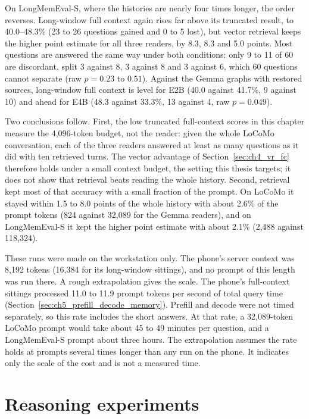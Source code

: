 On LongMemEval-S, where the histories are nearly four times longer, the order reverses. Long-window
full context again rises far above its truncated result, to 40.0--48.3\% (23 to 26 questions gained
and 0 to 5 lost), but vector retrieval keeps the higher point estimate for all three readers, by 8.3,
8.3 and 5.0 points. Most questions are answered the same way under both conditions: only 9 to 11 of
60 are discordant, split 3 against 8, 3 against 8 and 3 against 6, which 60 questions cannot
separate (raw $p=0.23$ to $0.51$). Against the Gemma graphs with restored sources, long-window full
context is level for E2B (40.0 against 41.7\%, 9 against 10) and ahead for E4B (48.3 against 33.3\%,
13 against 4, raw $p=0.049$).

Two conclusions follow. First, the low truncated full-context scores in this chapter measure the
4,096-token budget, not the reader: given the whole LoCoMo conversation, each of the three readers
answered at least as many questions as it did with ten retrieved turns. The vector advantage of
Section~\ref{sec:ch4_vr_fc} therefore holds under a small context budget, the setting this thesis
targets; it does not show that retrieval beats reading the whole history.
Second, retrieval kept most of that accuracy with a small fraction of the prompt. On LoCoMo it
stayed within 1.5 to 8.0 points of the whole history with about 2.6\% of the prompt tokens (824 against 32,089 for the
Gemma readers), and on LongMemEval-S it kept the higher point estimate with about 2.1\% (2,488
against 118,324).

These runs were made on the workstation only. The phone's server context was 8,192 tokens (16,384
for its long-window sittings), and no prompt of this length was run there. A rough extrapolation
gives the scale. The phone's full-context sittings processed 11.0 to 11.9 prompt tokens per second
of total query time (Section~\ref{sec:ch5_prefill_decode_memory}). Prefill and decode were not
timed separately, so this rate includes the short answers. At that rate, a 32,089-token LoCoMo
prompt would take about 45 to 49 minutes per question, and a LongMemEval-S prompt about three
hours. The extrapolation assumes the rate holds at prompts several times longer than any run on the
phone. It indicates only the scale of the cost and is not a measured time.

\section{Reasoning experiments}
\label{sec:ch4_reasoning}

